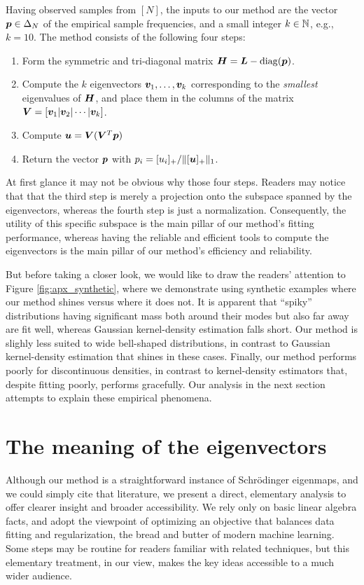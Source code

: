 \documentclass[10pt]{article} %
\DeclareMathOperator{\diag}{diag}
\begin{document}
Having observed samples from $[N]$, the inputs to our method are the vector ${\bm{p}} \in \Delta_N$ of the empirical sample frequencies, and a small integer $k \in {\mathbb{N}}$, e.g., $k = 10$. The method consists of the following four steps:
\begin{enumerate}
\item Form the symmetric and tri-diagonal matrix $\mH = \mL - \diag(\vp)$.
\item Compute the $k$ eigenvectors ${\bm{v}}_1, \dots, {\bm{v}}_k$ corresponding to the \emph{smallest} eigenvalues of ${\bm{H}}$, and place them in the columns of the matrix ${\bm{V}} = [{\bm{v}}_1 \vert {\bm{v}}_2 \vert \cdots \vert {\bm{v}}_k]$.
\item Compute ${\bm{u}} = {\bm{V}} ({\bm{V}}^T {\bm{p}})$
\item Return the vector ${\bm{p}}$ with ${p}_i = [u_i]_+ / \| [{\bm{u}}]_+ \|_1$.
\end{enumerate}
At first glance it may not be obvious why those four steps. Readers may notice that that the third step is merely a projection onto the subspace spanned by the eigenvectors, whereas the fourth step is just a normalization. Consequently, the utility of this specific subspace is the main pillar of our method's fitting performance, whereas having the reliable and efficient tools to compute the eigenvectors is the main pillar of our method's efficiency and reliability.

But before taking a closer look, we would like to draw the readers' attention to Figure \ref{fig:apx_synthetic}, where we demonstrate using synthetic examples where our method shines versus where it does not. It is apparent that ``spiky'' distributions having significant mass both around their modes but also far away are fit well, whereas Gaussian kernel-density estimation falls short. Our method is slighly less suited to wide bell-shaped distributions, in contrast to Gaussian kernel-density estimation that shines in these cases. Finally, our method performs poorly for discontinuous densities, in contrast to kernel-density estimators that, despite fitting poorly, performs gracefully. Our analysis in the next section attempts to explain these empirical phenomena.

\section{The meaning of the eigenvectors}\label{sec:analysis}
Although our method is a straightforward instance of Schr\"odinger eigenmaps, and we could simply cite that literature, we present a direct, elementary analysis to offer clearer insight and broader accessibility. We rely only on basic linear algebra facts, and adopt the viewpoint of optimizing an objective that balances data fitting and regularization, the bread and butter of modern machine learning. Some steps may be routine for readers familiar with related techniques, but this elementary treatment, in our view, makes the key ideas accessible to a much wider audience.
\end{document}
